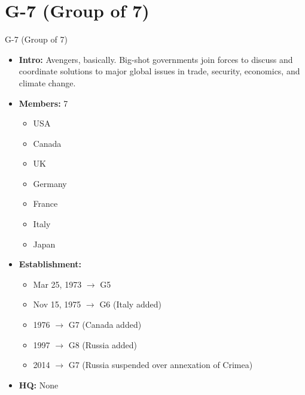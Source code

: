 \documentclass[
  10pt,
  ignorenonframetext,
  progressbar=frametitle]{beamer}
\providecommand{\tightlist}{%
  \setlength{\itemsep}{0pt}\setlength{\parskip}{0pt}}
\begin{document}
\section{G-7 (Group of 7)}
\begin{frame}[allowframebreaks]
{G-7 (Group of 7)}
\protect\hypertarget{g-7-group-of-7}{}
\begin{itemize}
\tightlist
\item
  \textbf{Intro:} Avengers, basically. Big-shot governments join forces
  to discuss and coordinate solutions to major global issues in trade,
  security, economics, and climate change.
\item
  \textbf{Members:} 7

  \begin{itemize}
  \tightlist
  \item
    USA
  \item
    Canada
  \item
    UK
  \item
    Germany
  \item
    France
  \item
    Italy
  \item
    Japan
  \end{itemize}
\item
  \textbf{Establishment:}

  \begin{itemize}
  \tightlist
  \item
    Mar 25, 1973 \(\rightarrow\) G5
  \item
    Nov 15, 1975 \(\rightarrow\) G6 (Italy added)
  \item
    1976 \(\rightarrow\) G7 (Canada added)
  \item
    1997 \(\rightarrow\) G8 (Russia added)
  \item
    2014 \(\rightarrow\) G7 (Russia suspended over annexation of Crimea)
  \end{itemize}
\item
  \textbf{HQ:} None
\end{itemize}
\end{frame}
\end{document}
